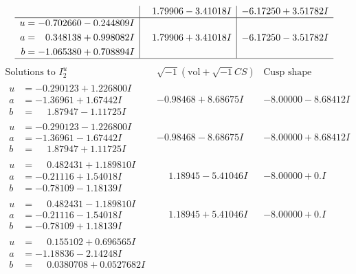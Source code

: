 \documentclass[1p]{elsarticle_modified}
\theoremstyle{definition}
\newcommand{\I}{\sqrt{-1}}
\begin{document}
$$\begin{array}{c|c|c}
 & \phantom{-}1.79906 - 3.41018 I & -6.17250 + 3.51782 I \\ \hline\begin{aligned}
u &= -0.702660 - 0.244809 I \\
a &= \phantom{-}0.348138 + 0.998082 I \\
b &= -1.065380 + 0.708894 I\end{aligned}
 & \phantom{-}1.79906 + 3.41018 I & -6.17250 - 3.51782 I\\
 \hline 
 \end{array}$$\newpage$$\begin{array}{c|c|c}  
\text{Solutions to }I^u_{2}& \I (\text{vol} + \sqrt{-1}CS) & \text{Cusp shape}\\
 \hline 
\begin{aligned}
u &= -0.290123 + 1.226800 I \\
a &= -1.36961 + 1.67442 I \\
b &= \phantom{-}1.87947 - 1.11725 I\end{aligned}
 & -0.98468 + 8.68675 I & -8.00000 - 8.68412 I \\ \hline\begin{aligned}
u &= -0.290123 - 1.226800 I \\
a &= -1.36961 - 1.67442 I \\
b &= \phantom{-}1.87947 + 1.11725 I\end{aligned}
 & -0.98468 - 8.68675 I & -8.00000 + 8.68412 I \\ \hline\begin{aligned}
u &= \phantom{-}0.482431 + 1.189810 I \\
a &= -0.21116 + 1.54018 I \\
b &= -0.78109 - 1.18139 I\end{aligned}
 & \phantom{-}1.18945 - 5.41046 I & -8.00000 + 0. I\phantom{ +0.000000I} \\ \hline\begin{aligned}
u &= \phantom{-}0.482431 - 1.189810 I \\
a &= -0.21116 - 1.54018 I \\
b &= -0.78109 + 1.18139 I\end{aligned}
 & \phantom{-}1.18945 + 5.41046 I & -8.00000 + 0. I\phantom{ +0.000000I} \\ \hline\begin{aligned}
u &= \phantom{-}0.155102 + 0.696565 I \\
a &= -1.18836 - 2.14248 I \\
b &= \phantom{-}0.0380708 + 0.0527682 I\end{aligned}

\end{array}$$
\end{document}
